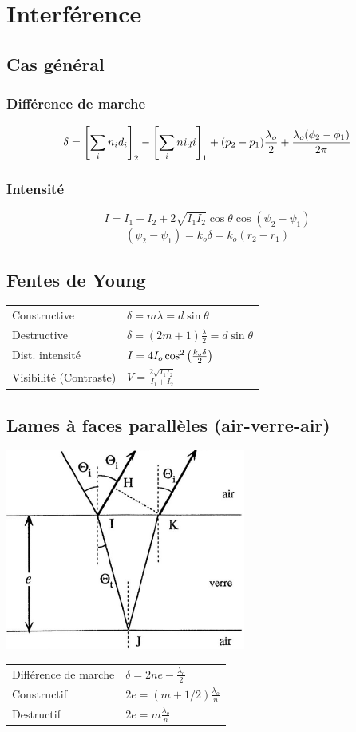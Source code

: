 \section{Interférence}
\subsection{Cas général}
\subsubsection{Différence de marche}
\[\delta=\qty[\sum_in_id_i]_2-\qty[\sum_ini_di]_1+(p_2-p_1)\frac{\lambda_o}{2}+\frac{\lambda_o(\phi_2-\phi_1)}{2\pi}\]

\subsubsection{Intensité}
\[I=I_1+I_2+2\sqrt{I_1I_2}\cos{\theta}\cos(\psi_2-\psi_1) \]
\[(\psi_2-\psi_1)=k_o\delta=k_o(r_2-r_1)\]


\subsection{Fentes de Young}
\begin{center}
    
\end{center}
\begin{tabular}{ll}
    Constructive & \(\delta=m\lambda=d\sin{\theta}\)\\
    Destructive & \(\delta=(2m+1)\frac{\lambda}{2}=d\sin{\theta}\)\\[8pt]
    Dist. intensité & \(I=4I_o\cos^2\qty(\frac{k_o\delta}{2}) \)\\[8pt]
    Visibilité (Contraste) & \(V=\frac{2\sqrt{I_1I_2}}{I_1+I_2}\)
\end{tabular}



\subsection{Lames à faces parallèles (air-verre-air)}
\begin{center}
    \includegraphics[height=.2\textwidth]{fig/parallel.PNG}
\end{center}
\begin{tabular}{ll}
    Différence de marche & \(\delta=2ne-\frac{\lambda_o}{2}\)\\
    Constructif & \(2e=(m+1/2)\frac{\lambda_o}{n}\) \\
    Destructif & \(2e=m\frac{\lambda_o}{n}\)
\end{tabular}

